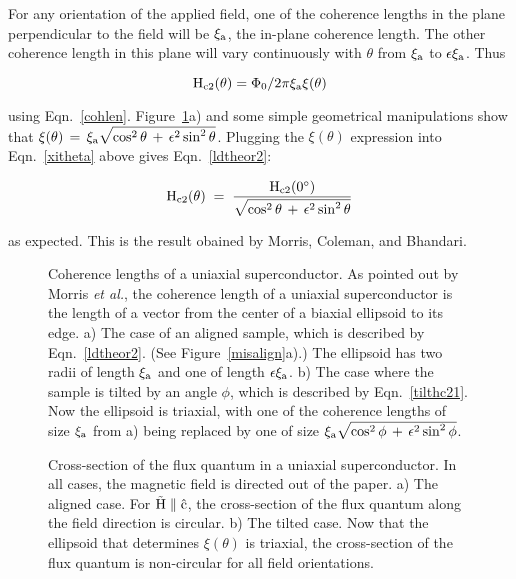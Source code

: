         For  any  orientation of the applied  field, one  of the  coherence
lengths  in the plane perpendicular  to the  field will be $\rm \xi_a$, the
in-plane coherence  length.  The other  coherence length in this plane will
vary continuously with $\theta$ from $\rm  \xi_a$ to $\rm  \epsilon \xi_a$.
Thus

\begin{equation}
\rm H_{c2}(\theta) =  \Phi_0/2 \pi  \xi_a  \xi(\theta)
\label{xitheta}
\end{equation}

\noindent using   Eqn.~\ref{cohlen}.  Figure~\ref{fquant}a)   and    some     simple
geometrical manipulations show that $\rm \xi(\theta) \, = \, \xi_a
\sqrt{\cos^2 \theta
\, + \, \epsilon^2 \sin^2 \theta }$.  Plugging the $\xi (\theta)$
expression   into  Eqn.~\ref{xitheta}  above   gives
Eqn.~\ref{ldtheor2}:

\begin{equation}
\label{ldtheor2}
\rm H_{c2}(\theta) \; = \; \frac{H_{c2}(0^{\circ})}{\sqrt{\cos^2\theta \,
+ \, \epsilon^2 \sin^2\theta}}
\end{equation}

\noindent as expected.  This is the result obained by Morris, Coleman, and Bhandari.\cite{morris72}

\begin{figure}
\vspace{15cm}
\caption[Coherence lengths of a uniaxial superconductor.]{Coherence lengths
of  a  uniaxial  superconductor.    As  pointed out  by   Morris  {\em   et
al.\/},\cite{morris72} the coherence length of a uniaxial superconductor is
the length of a vector from the center of a biaxial ellipsoid to  its edge.
a) The case of an aligned sample, which is described by Eqn.~\ref{ldtheor2}.
(See Figure~\ref{misalign}a).)  The ellipsoid has two  radii of length $\rm
\xi_a$ and one of length $\rm
\epsilon \xi_a$.  b) The case where the sample is tilted by an angle
$\phi$, which  is described by  Eqn.~\ref{tilthc21}.  Now  the  ellipsoid is
triaxial, with one of  the  coherence  lengths of size $\rm \xi_a$  from a)
being replaced by one of size $\rm \xi_a
\sqrt{\cos^2 \phi \, + \, \epsilon^2 \sin^2 \phi}$.}
\label{fquant}
\end{figure}

\begin{figure}
\vspace{18cm}
\caption[Cross-section of the flux quantum in a uniaxial
superconductor.]{Cross-section   of   the  flux   quantum   in   a uniaxial
superconductor.  In all cases,  the magnetic field is directed  out  of the
paper. a) The  aligned  case.   For $\rm  \vec{H}  \parallel  \hat{c}$, the
cross-section of  the flux quantum  along the  field direction is circular.
b) The tilted case.  Now that  the ellipsoid that  determines $\xi(\theta)$
is triaxial, the cross-section of the flux quantum  is non-circular for all
field orientations.}
\label{xsection}
\end{figure}

